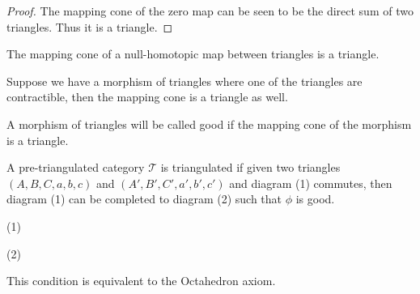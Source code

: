     \begin{proof}
        The mapping cone of the zero map can be seen to be the direct sum of two triangles. Thus it is a triangle.
    \end{proof}

    \begin{corollary}
        The mapping cone of a null-homotopic map between triangles is a triangle.
    \end{corollary}

    \begin{remark}
        Suppose we have a morphism of triangles where one of the triangles are contractible, then the mapping cone is a triangle as well.
    \end{remark}


    \begin{definition}
        A morphism of triangles will be called good if the mapping cone of the morphism is a triangle.
    \end{definition}

    \begin{theorem}
        A pre-triangulated category $\mathcal{T}$ is triangulated if given two triangles $(A,B,C,a,b,c)$ and $(A',B',C',a',b',c')$ and diagram (1) commutes, then diagram (1) can be completed to diagram (2) such that $\phi$ is good.
        \begin{center}
            (1)
            (2)
        \end{center}
    \end{theorem}

    \begin{remark}
         This condition is equivalent to the Octahedron axiom. 
    \end{remark}

